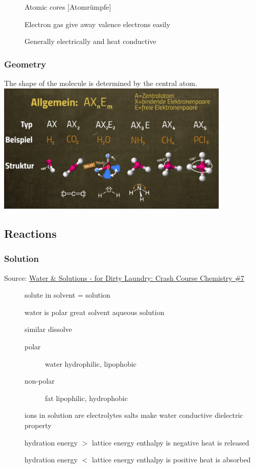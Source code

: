 \begin{description}
    \item[] Atomic cores [Atomrümpfe]
    \item[] Electron gas \arrow give away valence electrons easily
    \item[] Generally electrically and heat conductive
\end{description}

\subsubsection{Geometry}
The shape of the molecule is determined by the central atom.
\\
\includegraphics[width=30em]{./includes/chemistry/imgs/geometry.png}

\subsection{Reactions}

\subsubsection{Solution}
Source: \href{https://www.youtube.com/watch?v=AN4KifV12DA&list=PL8dPuuaLjXtPHzzYuWy6fYEaX9mQQ8oGr&index=8}{Water \& Solutions - for Dirty Laundry: Crash Course Chemistry \#7}

\begin{description}
    \item[] solute in solvent = solution 
    \item[] water is polar \arrow great solvent \arrow aqueous solution
    \item[] similar dissolve
    \begin{description}
        \item[polar] water \arrow hydrophilic, lipophobic
        \item[non-polar] fat \arrow lipophilic, hydrophobic
    \end{description}
    \item[] ions in solution are electrolytes \arrow salts make water conductive \arrow dielectric property
    \item[] hydration energy $>$ lattice energy \arrow enthalpy is negative \arrow heat is released
    \item[] hydration energy $<$ lattice energy \arrow enthalpy is positive \arrow heat is absorbed
\end{description}

